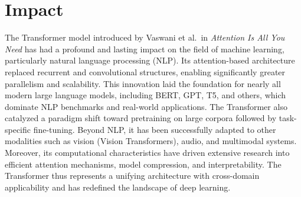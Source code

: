 \documentclass[10pt]{article}
\begin{document}
\section*{Impact}
The Transformer model introduced by Vaswani et al.\ in \textit{Attention Is All You Need} has had a profound and lasting impact on the field of machine learning, particularly natural language processing (NLP). Its attention-based architecture replaced recurrent and convolutional structures, enabling significantly greater parallelism and scalability. This innovation laid the foundation for nearly all modern large language models, including BERT\cite{DBLP:journals/corr/abs-1810-04805}, GPT\cite{radford2018improving}, T5\cite{DBLP:journals/corr/abs-1910-10683}, and others, which dominate NLP benchmarks and real-world applications. The Transformer also catalyzed a paradigm shift toward pretraining on large corpora followed by task-specific fine-tuning. Beyond NLP, it has been successfully adapted to other modalities such as vision (Vision Transformers), audio, and multimodal systems. Moreover, its computational characteristics have driven extensive research into efficient attention mechanisms, model compression, and interpretability. The Transformer thus represents a unifying architecture with cross-domain applicability and has redefined the landscape of deep learning.



\end{document}
